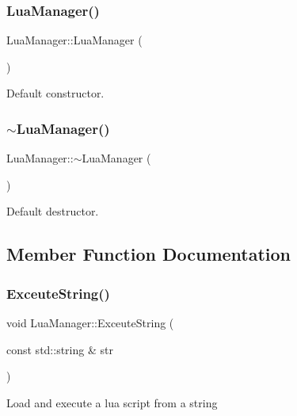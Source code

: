 \subsubsection{\texorpdfstring{Lua\+Manager()}{LuaManager()}}
{\footnotesize\ttfamily Lua\+Manager\+::\+Lua\+Manager (\begin{DoxyParamCaption}{ }\end{DoxyParamCaption})}

Default constructor. \mbox{\label{class_lua_manager_a26a821d05088bb1a6d7642b6312930aa}} 
\subsubsection{\texorpdfstring{$\sim$\+Lua\+Manager()}{~LuaManager()}}
{\footnotesize\ttfamily Lua\+Manager\+::$\sim$\+Lua\+Manager (\begin{DoxyParamCaption}{ }\end{DoxyParamCaption})}

Default destructor. 

\subsection{Member Function Documentation}
\mbox{\label{class_lua_manager_aa03c69244e112bcd5377c8fe965a5136}} 
\subsubsection{\texorpdfstring{Exceute\+String()}{ExceuteString()}}
{\footnotesize\ttfamily void Lua\+Manager\+::\+Exceute\+String (\begin{DoxyParamCaption}\item[{const std\+::string \&}]{str }\end{DoxyParamCaption})}

Load and execute a lua script from a string \mbox{\label{class_lua_manager_a5c770602033c62a3eba4ece231c33ed5}} 

